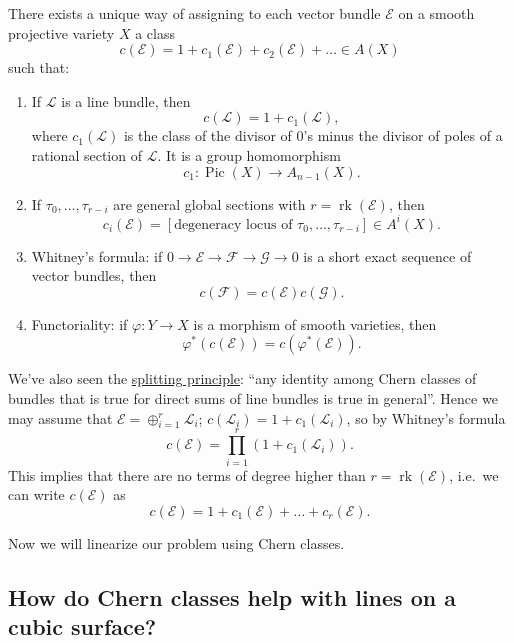 \documentclass[12pt,a4paper]{amsart}
\theoremstyle{plain}
\theoremstyle{definition}
\theoremstyle{remark}
\begin{document}
There exists a unique way of assigning to each vector bundle $\mathscr{E}$ on a smooth projective variety $X$ a class
\[ c(\mathscr{E}) = 1 + c_{1}(\mathscr{E}) + c_{2}(\mathscr{E}) + \ldots \in A(X) \]
such that:
\begin{enumerate}[label=\arabic*)]
  \item If $\mathscr{L}$ is a line bundle, then
    \[ c(\mathscr{L}) = 1 + c_{1}(\mathscr{L}), \]
    where $c_{1}(\mathscr{L})$ is the class of the divisor of $0$'s minus the divisor of poles of a rational section of $\mathscr{L}$.
    It is a group homomorphism
    \[ c_{1} \colon \operatorname{Pic}(X) \to A_{n-1}(X). \]
  \item If $\tau_{0}, \ldots, \tau_{r-i}$ are general global sections with $r = \operatorname{rk}(\mathscr{E})$, then
    \[ c_{i}(\mathscr{E}) = [ \text{degeneracy locus of } \tau_{0}, \ldots, \tau_{r-i} ] \in A^{i}(X). \]
  \item Whitney's formula: if $0 \to \mathscr{E} \to \mathscr{F} \to \mathscr{G} \to 0$ is a short exact sequence of vector bundles, then
    \[ c(\mathscr{F}) = c(\mathscr{E})c(\mathscr{G}). \]
  \item Functoriality: if $\varphi \colon Y \to X$ is a morphism of smooth varieties, then
    \[ \varphi^{*}(c(\mathscr{E})) = c(\varphi^{*}(\mathscr{E})). \]
\end{enumerate}

We've also seen the \underline{splitting principle}: ``any identity among Chern classes of bundles that is true for direct sums of line bundles is true in general''.
Hence we may assume that $\mathscr{E} = \oplus_{i=1}^{r} \mathscr{L}_{i}$; $c(\mathscr{L}_{i}) = 1 + c_{1}(\mathscr{L}_{i})$, so by Whitney's formula
\[ c(\mathscr{E}) = \prod_{i=1}^{r} (1 + c_{1}(\mathscr{L}_{i})). \]
This implies that there are no terms of degree higher than $r = \operatorname{rk}(\mathscr{E})$, i.e.~we can write $c(\mathscr{E})$ as
\[ c(\mathscr{E}) = 1 + c_{1}(\mathscr{E}) + \ldots + c_{r}(\mathscr{E}). \]

Now we will linearize our problem using Chern classes.

\subsection{How do Chern classes help with lines on a cubic surface?}
\end{document}
